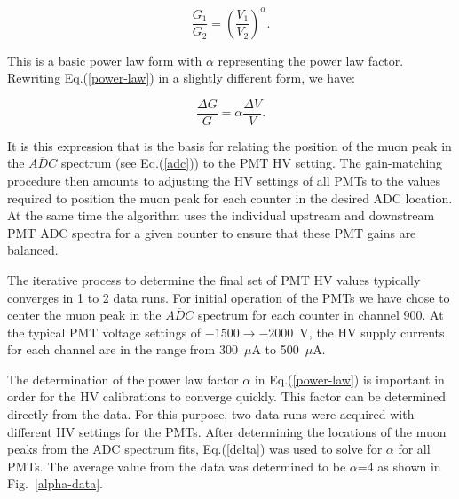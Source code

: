 \documentclass{elsart}
\begin{document}
\begin{equation}
\label{power-law}
\frac{G_1}{G_2} = \left( \frac{V_1}{V_2} \right) ^\alpha.
\end{equation}

\noindent
This is a basic power law form with $\alpha$ representing the power law factor. Rewriting
Eq.(\ref{power-law}) in a slightly different form, we have:

\begin{equation}
\label{delta}
\frac{\Delta G}{G} = \alpha \frac{\Delta V}{V}.
\end{equation}

It is this expression that is the basis for relating the position of the muon peak in the $\overline{ADC}$
spectrum (see Eq.(\ref{adc})) to the PMT HV setting. The gain-matching procedure then amounts to
adjusting the HV settings of all PMTs to the values required to position the muon peak for each counter
in the desired ADC location. At the same time the algorithm uses the individual upstream and downstream
PMT ADC spectra for a given counter to ensure that these PMT gains are balanced.

The iterative process to determine the final set of PMT HV values typically converges in 1 to 2 data runs.
For initial operation of the PMTs we have chose to center the muon peak in the $\overline{ADC}$ spectrum
for each counter in channel 900. At the typical PMT voltage settings of $-1500 \to -2000$~V, the HV supply
currents for each channel are in the range from 300~$\mu$A to 500~$\mu$A. 

The determination of the power law factor $\alpha$ in Eq.(\ref{power-law}) is important in order for the
HV calibrations to converge quickly. This factor can be determined directly from the data. For this purpose,
two data runs were acquired with different HV settings for the PMTs. After determining the locations of the
muon peaks from the ADC spectrum fits, Eq.(\ref{delta}) was used to solve for $\alpha$ for all PMTs. The
average value from the data was determined to be $\alpha$=4 as shown in Fig.~\ref{alpha-data}.
\end{document}
